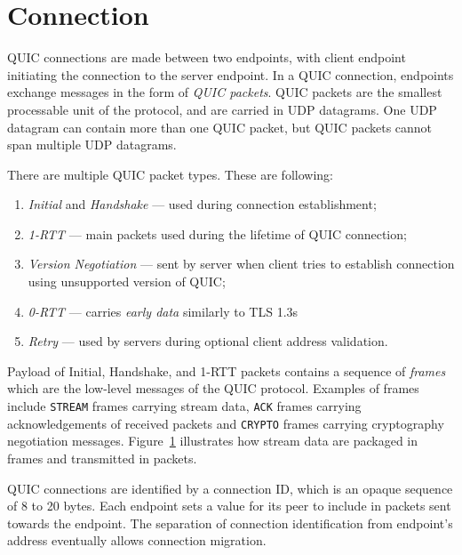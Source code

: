 \section{Connection}

QUIC connections are made between two endpoints, with client endpoint initiating the connection to
the server endpoint. In a QUIC connection, endpoints exchange messages in the form of \textit{QUIC
packets}. QUIC packets are the smallest processable unit of the protocol, and are carried in UDP
datagrams. One UDP datagram can contain more than one QUIC packet, but QUIC packets cannot span
multiple UDP datagrams.

There are multiple QUIC packet types. These are following:

\begin{enumerate}
  \item \textit{Initial} and \textit{Handshake} --- used during connection establishment;
  \item \textit{1-RTT} --- main packets used during the lifetime of QUIC connection;
  \item \textit{Version Negotiation} --- sent by server when client tries to establish connection
    using unsupported version of QUIC\@;
  \item \textit{0-RTT} --- carries \textit{early data} similarly to TLS 1.3s 
  \item \textit{Retry} --- used by servers during optional  client address validation.
\end{enumerate}

Payload of Initial, Handshake, and 1-RTT packets contains a sequence of \textit{frames} which are
the low-level messages of the QUIC protocol. Examples of frames include \texttt{STREAM} frames
carrying stream data, \texttt{ACK} frames carrying acknowledgements of received packets and
\texttt{CRYPTO} frames carrying cryptography negotiation messages.
Figure~\ref{fig:streams-frames-and-packets} illustrates how stream data are packaged in frames and
transmitted in packets.

\begin{figure}[h]\label{fig:streams-frames-and-packets}
  \centering
\end{figure}

QUIC connections are identified by a connection ID, which is an opaque sequence of 8 to 20 bytes.
Each endpoint sets a value for its peer to include in packets sent towards the endpoint. The
separation of connection identification from endpoint's address eventually allows connection
migration.


